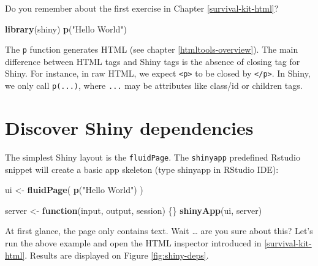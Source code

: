 \documentclass[]{book}
\newenvironment{Shaded}{\begin{snugshade}}{\end{snugshade}}
\newcommand{\ControlFlowTok}[1]{\textcolor[rgb]{0.13,0.29,0.53}{\textbf{#1}}}
\newcommand{\KeywordTok}[1]{\textcolor[rgb]{0.13,0.29,0.53}{\textbf{#1}}}
\newcommand{\NormalTok}[1]{#1}
\newcommand{\StringTok}[1]{\textcolor[rgb]{0.31,0.60,0.02}{#1}}
\begin{document}
Do you remember about the first exercise in Chapter \ref{survival-kit-html}?

\begin{Shaded}
\begin{Highlighting}[]
\KeywordTok{library}\NormalTok{(shiny)}
\KeywordTok{p}\NormalTok{(}\StringTok{"Hello World"}\NormalTok{)}
\end{Highlighting}
\end{Shaded}

The \texttt{p} function generates HTML (see chapter \ref{htmltools-overview}). The main difference between HTML tags and Shiny tags is the absence of closing tag for Shiny. For instance, in raw HTML, we expect \texttt{\textless{}p\textgreater{}} to be closed by \texttt{\textless{}/p\textgreater{}}. In Shiny, we only call \texttt{p(...)}, where \texttt{...} may be attributes like class/id or children tags.

\hypertarget{discover-shiny-dependencies}{%
\section{Discover Shiny dependencies}\label{discover-shiny-dependencies}}

The simplest Shiny layout is the \texttt{fluidPage}. The \texttt{shinyapp} predefined Rstudio snippet will create a basic app skeleton (type shinyapp in RStudio IDE):

\begin{Shaded}
\begin{Highlighting}[]
\NormalTok{ui <-}\StringTok{ }\KeywordTok{fluidPage}\NormalTok{(}
  \KeywordTok{p}\NormalTok{(}\StringTok{"Hello World"}\NormalTok{)}
\NormalTok{)}

\NormalTok{server <-}\StringTok{ }\ControlFlowTok{function}\NormalTok{(input, output, session) \{\}}
\KeywordTok{shinyApp}\NormalTok{(ui, server)}
\end{Highlighting}
\end{Shaded}

At first glance, the page only contains text. Wait \ldots{} are you sure about this? Let's run the above example and open the HTML inspector introduced in \ref{survival-kit-html}. Results are displayed on Figure \ref{fig:shiny-deps}.
\end{document}
